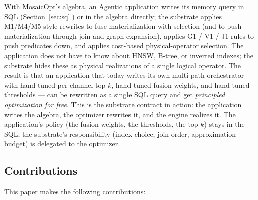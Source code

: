 \documentclass[sigconf,nonacm,review]{acmart}
\theoremstyle{plain}
\theoremstyle{definition}
\theoremstyle{remark}
\begin{document}
With MosaicOpt's algebra, an Agentic application writes its memory
query in SQL (Section~\ref{sec:sql}) or in the algebra directly; the
substrate applies M1/M4/M5-style rewrites to fuse materialization
with selection (and to push materialization through join and graph
expansion), applies G1 / V1 / J1 rules to push predicates down, and
applies cost-based physical-operator selection. The application does
not have to know about HNSW, B-tree, or inverted indexes; the
substrate hides these as physical realizations of a single logical
operator. The result is that an application that today writes its own
multi-path orchestrator --- with hand-tuned per-channel top-$k$,
hand-tuned fusion weights, and hand-tuned thresholds --- can be
rewritten as a single SQL query and get \emph{principled
optimization for free}. This is the substrate contract in action:
the application writes the algebra, the optimizer rewrites it, and
the engine realizes it. The application's policy (the fusion
weights, the thresholds, the top-$k$) stays in the SQL; the
substrate's responsibility (index choice, join order, approximation
budget) is delegated to the optimizer.

\subsection{Contributions}\label{sec:contrib}

This paper makes the following contributions:
\end{document}
